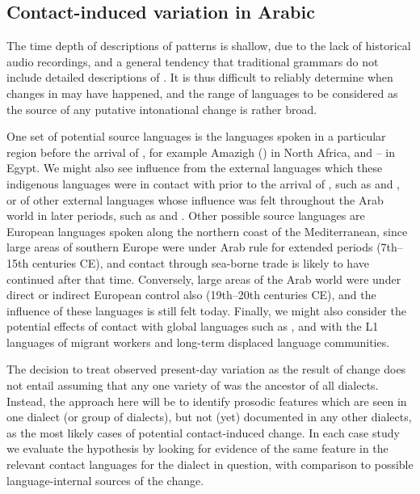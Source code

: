 \documentclass[output=paper]{langsci/langscibook}
\begin{document}
 
 \subsection{Contact-induced variation in Arabic} \label{aravar}


The time depth of descriptions of  patterns is shallow, due to the lack of historical audio recordings, and a general tendency that traditional grammars do not include detailed descriptions of . It is thus difficult to reliably determine when changes in  may have happened, and the range of languages to be considered as the source of any putative intonational change is rather broad. 

One set of potential source languages is the  languages spoken in a particular region before the arrival of , for example Amazigh () in North Africa, and -- in Egypt. We might also see influence from the external languages which these indigenous languages were in contact with prior to the arrival of , such as  and , or of other external languages whose influence was felt throughout the Arab world in later periods, such as  and . Other possible source languages are European languages spoken along the northern coast of the Mediterranean, since large areas of southern Europe were under Arab rule for extended periods (7th--15th centuries CE), and contact through sea-borne trade is likely to have continued after that time. Conversely, large areas of the Arab world were under direct or indirect European control also (19th--20th centuries CE), and the influence of these languages is still felt today. Finally, we might also consider the potential effects of contact with global languages such as , and with the L1 languages of migrant workers and long-term displaced language communities.

The decision to treat observed present-day variation as the result of change does not entail assuming that any one variety of  was the ancestor of all dialects. Instead, the approach here will be to identify prosodic features which are seen in one  dialect (or group of dialects), but not (yet) documented in any other dialects, as the most likely cases of potential contact-induced change. In each case study we evaluate the hypothesis by looking for evidence of the same feature in the relevant contact languages for the dialect in question, with comparison to possible language-internal sources of the change. 
\end{document}
